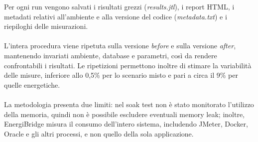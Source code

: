 \documentclass[12pt,a4paper]{article}
\begin{document}
    Per ogni run vengono salvati i risultati grezzi (\textit{results.jtl}),
    i report HTML, i metadati relativi all'ambiente e alla versione del codice
    (\textit{metadata.txt}) e i riepiloghi delle misurazioni. \\ \\
    L'intera procedura viene ripetuta sulla versione \textit{before} e sulla
    versione \textit{after}, mantenendo invariati ambiente, database e parametri,
    così da rendere confrontabili i risultati. Le ripetizioni permettono inoltre
    di stimare la variabilità delle misure, inferiore allo 0,5\% per lo scenario
    misto e pari a circa il 9\% per quelle energetiche. \\ \\
    La metodologia presenta due limiti: nel soak test non è stato monitorato
    l'utilizzo della memoria, quindi non è possibile escludere eventuali memory
    leak; inoltre, EnergiBridge misura il consumo dell'intero sistema, includendo
    JMeter, Docker, Oracle e gli altri processi, e non quello della sola applicazione.
\end{document}
